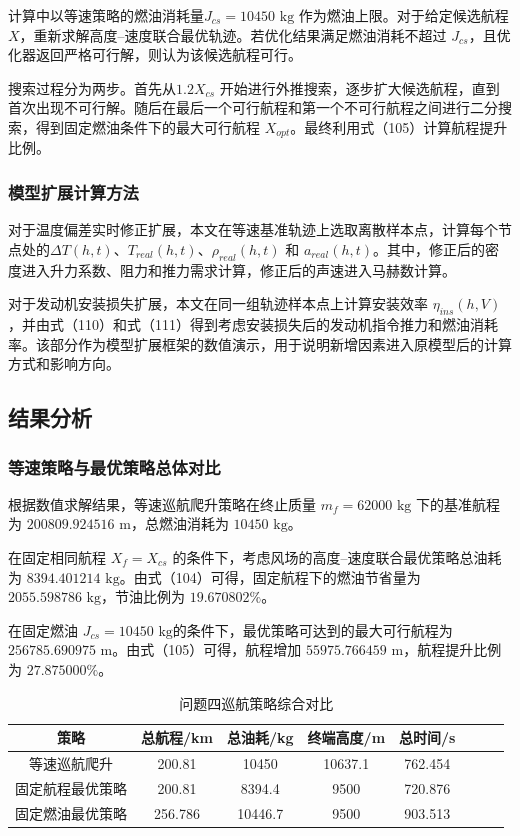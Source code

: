 \documentclass[withoutpreface,bwprint]{cumcmthesis} %
\begin{document}
计算中以等速策略的燃油消耗量$J_{cs}=10450\text{ kg}$ 作为燃油上限。对于给定候选航程 $X$，重新求解高度–速度联合最优轨迹。若优化结果满足燃油消耗不超过 $J_{cs}$，且优化器返回严格可行解，则认为该候选航程可行。

搜索过程分为两步。首先从$1.2X_{cs}$ 开始进行外推搜索，逐步扩大候选航程，直到首次出现不可行解。随后在最后一个可行航程和第一个不可行航程之间进行二分搜索，得到固定燃油条件下的最大可行航程 $X_{opt}$。最终利用式（105）计算航程提升比例。
\subsubsection{模型扩展计算方法}
对于温度偏差实时修正扩展，本文在等速基准轨迹上选取离散样本点，计算每个节点处的$\Delta T(h,t)$、$T_{real}(h,t)$、$\rho_{real}(h,t)$ 和 $a_{real}(h,t)$。其中，修正后的密度进入升力系数、阻力和推力需求计算，修正后的声速进入马赫数计算。

对于发动机安装损失扩展，本文在同一组轨迹样本点上计算安装效率 $\eta_{ins}(h,V)$，并由式（110）和式（111）得到考虑安装损失后的发动机指令推力和燃油消耗率。该部分作为模型扩展框架的数值演示，用于说明新增因素进入原模型后的计算方式和影响方向。
\subsection{结果分析}
\subsubsection{等速策略与最优策略总体对比}
根据数值求解结果，等速巡航爬升策略在终止质量 $m_f=62000\text{ kg}$ 下的基准航程为 $200809.924516\text{ m}$，总燃油消耗为 $10450\text{ kg}$。

在固定相同航程 $X_f=X_{cs}$ 的条件下，考虑风场的高度–速度联合最优策略总油耗为 $8394.401214\text{ kg}$。由式（104）可得，固定航程下的燃油节省量为 $2055.598786\text{ kg}$，节油比例为 $19.670802\%$。

在固定燃油 $J_{cs}=10450\text{ kg}$的条件下，最优策略可达到的最大可行航程为 $256785.690975\text{ m}$。由式（105）可得，航程增加 $55975.766459\text{ m}$，航程提升比例为 $27.875000\%$。
\begin{table}[htbp]
\centering
\caption{问题四巡航策略综合对比}
\label{tab:comprehensive_comparison}
\begin{tabular}{cccccccc}
\toprule
 策略 & 总航程/km & 总油耗/kg & 终端高度/m  & 总时间/s \\
\midrule
 等速巡航爬升 & 200.81 & 10450 & 10637.1 & 762.454 \\
 固定航程最优策略 & 200.81 & 8394.4  & 9500 & 720.876 \\
 固定燃油最优策略 & 256.786 & 10446.7  & 9500 & 903.513 \\
\bottomrule
\end{tabular}
\end{table}
\end{document}
